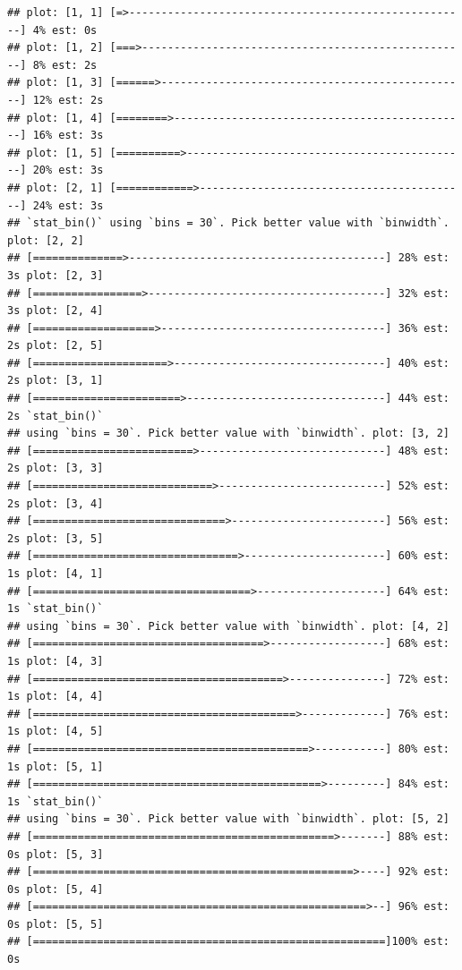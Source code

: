 \documentclass[
]{article}
\begin{document}
\begin{verbatim}
## plot: [1, 1] [=>-----------------------------------------------------] 4% est: 0s
## plot: [1, 2] [===>---------------------------------------------------] 8% est: 2s
## plot: [1, 3] [======>------------------------------------------------] 12% est: 2s
## plot: [1, 4] [========>----------------------------------------------] 16% est: 3s
## plot: [1, 5] [==========>--------------------------------------------] 20% est: 3s
## plot: [2, 1] [============>------------------------------------------] 24% est: 3s
## `stat_bin()` using `bins = 30`. Pick better value with `binwidth`. plot: [2, 2]
## [==============>----------------------------------------] 28% est: 3s plot: [2, 3]
## [=================>-------------------------------------] 32% est: 3s plot: [2, 4]
## [===================>-----------------------------------] 36% est: 2s plot: [2, 5]
## [=====================>---------------------------------] 40% est: 2s plot: [3, 1]
## [=======================>-------------------------------] 44% est: 2s `stat_bin()`
## using `bins = 30`. Pick better value with `binwidth`. plot: [3, 2]
## [=========================>-----------------------------] 48% est: 2s plot: [3, 3]
## [============================>--------------------------] 52% est: 2s plot: [3, 4]
## [==============================>------------------------] 56% est: 2s plot: [3, 5]
## [================================>----------------------] 60% est: 1s plot: [4, 1]
## [==================================>--------------------] 64% est: 1s `stat_bin()`
## using `bins = 30`. Pick better value with `binwidth`. plot: [4, 2]
## [====================================>------------------] 68% est: 1s plot: [4, 3]
## [=======================================>---------------] 72% est: 1s plot: [4, 4]
## [=========================================>-------------] 76% est: 1s plot: [4, 5]
## [===========================================>-----------] 80% est: 1s plot: [5, 1]
## [=============================================>---------] 84% est: 1s `stat_bin()`
## using `bins = 30`. Pick better value with `binwidth`. plot: [5, 2]
## [===============================================>-------] 88% est: 0s plot: [5, 3]
## [==================================================>----] 92% est: 0s plot: [5, 4]
## [====================================================>--] 96% est: 0s plot: [5, 5]
## [=======================================================]100% est: 0s
\end{verbatim}
\end{document}
